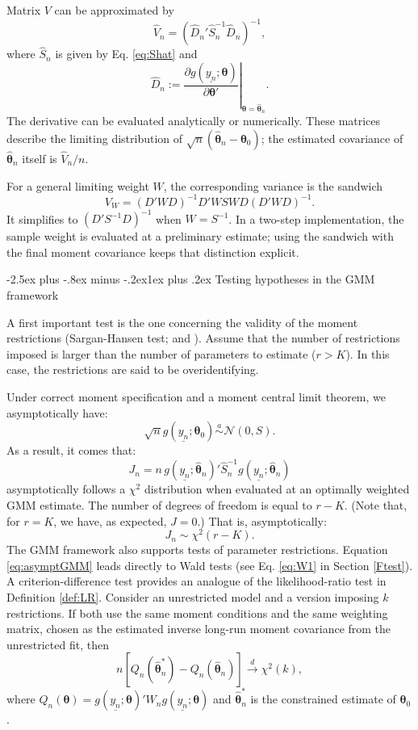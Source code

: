 \documentclass[
  11pt,
]{book}
\makeatletter
\renewcommand\subsection{\@startsection{subsection}{2}{\z@}
  {-2.5ex plus -.8ex minus -.2ex}{1ex plus .2ex}
  {\normalfont\large\bfseries\color{TextbookInk}}}
\theoremstyle{definition}
\theoremstyle{definition}
\theoremstyle{definition}
\theoremstyle{definition}
\theoremstyle{remark}
\makeatother
\begin{document}
Matrix \(V\) can be approximated by
\begin{equation}
\hat{V}_n = (\hat{D}_n'\hat{S}_n^{-1}\hat{D}_n)^{-1},\label{eq:VGMM}
\end{equation}
where \(\hat{S}_n\) is given by Eq. \eqref{eq:Shat} and
\[
\hat{D}_n := \left.\frac{\partial g(\underline{y_n};\boldsymbol\theta)}{\partial \boldsymbol\theta'}\right|_{\boldsymbol\theta = \hat{\boldsymbol\theta}_n}.
\]
The derivative can be evaluated analytically or numerically. These matrices describe the limiting distribution of \(\sqrt n(\widehat{\boldsymbol\theta}_n-\boldsymbol\theta_0)\); the estimated covariance of \(\widehat{\boldsymbol\theta}_n\) itself is \(\widehat V_n/n\).

For a general limiting weight \(W\), the corresponding variance is the sandwich
\[
V_W=(D'WD)^{-1}D'WSWD(D'WD)^{-1}.
\]
It simplifies to \((D'S^{-1}D)^{-1}\) when \(W=S^{-1}\). In a two-step implementation, the sample weight is evaluated at a preliminary estimate; using the sandwich with the final moment covariance keeps that distinction explicit.

\subsection{Testing hypotheses in the GMM framework}\label{overidentif}

A first important test is the one concerning the validity of the moment restrictions (Sargan-Hansen test; \citet{Sargan_1958} and \citet{Hansen_1982}). Assume that the number of restrictions imposed is larger than the number of parameters to estimate (\(r>K\)). In this case, the restrictions are said to be overidentifying.

Under correct moment specification and a moment central limit theorem, we asymptotically have:
\[
\sqrt{n}g(\underline{y_n};{\boldsymbol\theta}_0)  \overset{a}{\sim} \mathcal{N}(0,S).
\]
As a result, it comes that:
\begin{equation}
J_n = n\,g(\underline{y_n};\hat{\boldsymbol\theta}_n)'\hat S_n^{-1}g(\underline{y_n};\hat{\boldsymbol\theta}_n) \label{eq:HansenSargan}
\end{equation}
asymptotically follows a \(\chi^2\) distribution when evaluated at an optimally weighted GMM estimate. The number of degrees of freedom is equal to \(r-K\). (Note that, for \(r=K\), we have, as expected, \(J=0\).) That is, asymptotically:
\[
J_n \sim \chi^2(r-K).
\]
The GMM framework also supports tests of parameter restrictions. Equation \eqref{eq:asymptGMM} leads directly to Wald tests (see Eq. \eqref{eq:W1} in Section \ref{Ftest}). A criterion-difference test provides an analogue of the likelihood-ratio test in Definition \ref{def:LR}. Consider an unrestricted model and a version imposing \(k\) restrictions. If both use the same moment conditions and the same weighting matrix, chosen as the estimated inverse long-run moment covariance from the unrestricted fit, then
\[
n\left[Q_n(\hat{{\boldsymbol\theta}}^*_n)-Q_n(\hat{{\boldsymbol\theta}}_n)\right]\overset{d}{\rightarrow}\chi^2(k),
\]
where \(Q_n(\boldsymbol\theta)=g(\underline{y_n};\boldsymbol\theta)'W_n g(\underline{y_n};\boldsymbol\theta)\) and \(\hat{{\boldsymbol\theta}}^*_n\) is the constrained estimate of \({\boldsymbol\theta}_0\).
\end{document}
